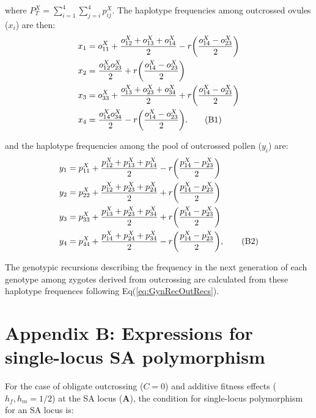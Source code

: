 \documentclass{article}
\newcommand\numberthis{\addtocounter{equation}{1}\tag{\theequation}}
\begin{document}
\noindent where $P^X_T = \sum_{i=1}^{4}\sum_{j=i}^{4} p^X_{ij}$. The haplotype frequencies among outcrossed ovules ($x_i$) are then:
\begin{align*} 
    x_{1} &= o^X_{11} + \frac{o^X_{12} + o^X_{13} + o^X_{14}}{2} - r \bigg( \frac{o^X_{14} - o^X_{23}}{2} \bigg)  \\
    x_{2} &= \frac{o^X_{12} o^X_{23}}{2} + r \bigg( \frac{o^X_{14} - o^X_{23}}{2} \bigg) \\
    x_{3} &= o^X_{33} + \frac{o^X_{13} + o^X_{23} + o^X_{34}}{2} + r \bigg( \frac{o^X_{14} - o^X_{23}}{2} \bigg)  \\
    x_{4} &= \frac{o^X_{14} o^X_{34}}{2} - r \bigg( \frac{o^X_{14} - o^X_{23}}{2} \bigg).  \numberthis
\end{align*}

\noindent and the haplotype frequencies among the pool of outcrossed pollen ($y_i$) are:
\begin{align*} 
    y_{1} &= p^X_{11} + \frac{p^X_{12} + p^X_{13} + p^X_{14}}{2} - r \bigg( \frac{p^X_{14} - p^X_{23}}{2} \bigg)  \\
    y_{2} &= p^X_{22} + \frac{p^X_{12} + p^X_{23} + p^X_{24}}{2} + r \bigg( \frac{p^X_{14} - p^X_{23}}{2} \bigg)  \\
    y_{3} &= p^X_{33} + \frac{p^X_{13} + p^X_{23} + p^X_{34}}{2} + r \bigg( \frac{p^X_{14} - p^X_{23}}{2} \bigg)  \\
    y_{4} &= p^X_{44} + \frac{p^X_{14} + p^X_{24} + p^X_{34}}{2} - r \bigg( \frac{p^X_{14} - p^X_{23}}{2} \bigg),  \numberthis
\end{align*}

\noindent The genotypic recursions describing the frequency in the next generation of each genotype among zygotes derived from outcrossing are calculated from these haplotype frequences following Eq(\ref{eq:GynRecOutRecs}).

\newpage{}




\section*{Appendix B: Expressions for single-locus SA polymorphism}
\renewcommand{\theequation}{B\arabic{equation}}
\setcounter{equation}{0}
\renewcommand{\thefigure}{B\arabic{figure}}
\setcounter{figure}{0}

For the case of obligate outcrossing ($C = 0$) and additive fitness effects ($h_f, h_m = 1/2$) at the SA locus ($\mathbf{A}$), the condition for single-locus polymorphism for an SA locus is:
\end{document}
